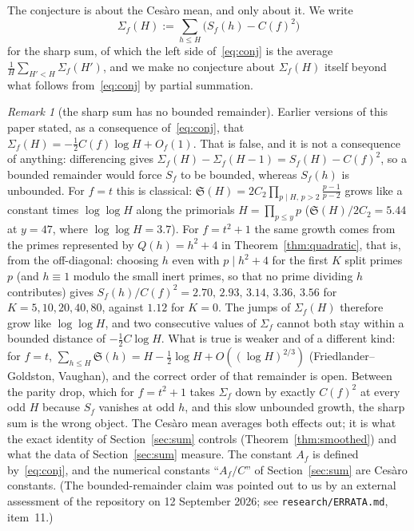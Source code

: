 \documentclass[11pt,a4paper]{article}
\theoremstyle{remark}\newtheorem{remark}[theorem]{Remark}
\newcommand{\Sig}{\mathfrak S}
\begin{document}
The conjecture is about the Ces\`aro mean, and only about it. We write
\begin{equation}\label{eq:conjsharp}
\Sigma_f(H):=\sum_{h\le H}\bigl(S_f(h)-C(f)^2\bigr)
\end{equation}
for the sharp sum, of which the left side of~\eqref{eq:conj} is the average $\frac1H\sum_{H'<H}\Sigma_f(H')$, and we
make no conjecture about $\Sigma_f(H)$ itself beyond what follows from~\eqref{eq:conj} by partial summation.

\begin{remark}[the sharp sum has no bounded remainder]\label{rem:sharp}
Earlier versions of this paper stated, as a consequence of~\eqref{eq:conj}, that
$\Sigma_f(H)=-\tfrac12C(f)\log H+O_f(1)$. That is false, and it is not a consequence of anything: differencing gives
$\Sigma_f(H)-\Sigma_f(H-1)=S_f(H)-C(f)^2$, so a bounded remainder would force $S_f$ to be bounded, whereas $S_f(h)$
is unbounded. For $f=t$ this is classical: $\Sig(H)=2C_2\prod_{p\mid H,\,p>2}\frac{p-1}{p-2}$ grows like a constant
times $\log\log H$ along the primorials $H=\prod_{p\le y}p$ ($\Sig(H)/2C_2=5.44$ at $y=47$, where $\log\log H=3.7$).
For $f=t^2+1$ the same growth comes from the primes represented by $Q(h)=h^2+4$ in Theorem~\ref{thm:quadratic}, that
is, from the off-diagonal: choosing $h$ even with $p\mid h^2+4$ for the first $K$ split primes $p$ (and $h\equiv1$
modulo the small inert primes, so that no prime dividing $h$ contributes) gives
$S_f(h)/C(f)^2=2.70,\,2.93,\,3.14,\,3.36,\,3.56$ for $K=5,10,20,40,80$, against $1.12$ for $K=0$. The jumps of
$\Sigma_f(H)$ therefore grow like $\log\log H$, and two consecutive values of $\Sigma_f$ cannot both stay within a
bounded distance of $-\tfrac12C\log H$. What is true is weaker and of a different kind: for $f=t$,
$\sum_{h\le H}\Sig(h)=H-\tfrac12\log H+O((\log H)^{2/3})$ (Friedlander--Goldston, Vaughan), and the correct order of
that remainder is open. Between the parity drop, which for $f=t^2+1$ takes $\Sigma_f$ down by exactly $C(f)^2$ at
every odd $H$ because $S_f$ vanishes at odd $h$, and this slow unbounded growth, the sharp sum is the wrong object.
The Ces\`aro mean averages both effects out; it is what the exact identity of Section~\ref{sec:sum} controls
(Theorem~\ref{thm:smoothed}) and what the data of Section~\ref{sec:sum} measure. The constant $A_f$ is defined
by~\eqref{eq:conj}, and the numerical constants ``$A_f/C$'' of Section~\ref{sec:sum} are Ces\`aro constants. (The
bounded-remainder claim was pointed out to us by an external assessment of the repository on 12 September 2026; see
\texttt{research/ERRATA.md}, item~11.)
\end{remark}
\end{document}
